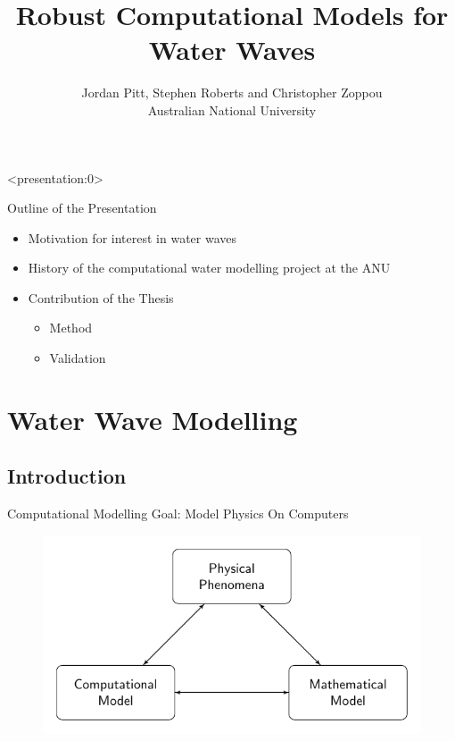 \documentclass[pdf]{beamer}
\title{Robust Computational Models for Water Waves}
\author{Jordan Pitt, Stephen Roberts and Christopher Zoppou \\ Australian National University}
\begin{document}
	\begin{frame}<presentation:0>
		\cite{Zoppou-2014} \cite{Pitt-2018-61}
	\end{frame}
\begin{frame}
\titlepage
\end{frame}
\begin{frame}{Outline of the Presentation}
	
	\begin{itemize}
		\item Motivation for interest in water waves
		\item History of the computational water modelling project at the ANU
		\item Contribution of the Thesis
		\begin{itemize}
			\item Method
			\item Validation
		\end{itemize}
	\end{itemize}
	
\end{frame}

\section{Water Wave Modelling}
\subsection{Introduction}
\begin{frame}{Computational Modelling}
	Goal: Model Physics On Computers \pause
	\begin{figure}
		\includegraphics[width=\textwidth]{./Pics/ModelDiagrams/FlowChart.pdf}
	\end{figure}
\end{frame}
\end{document}
